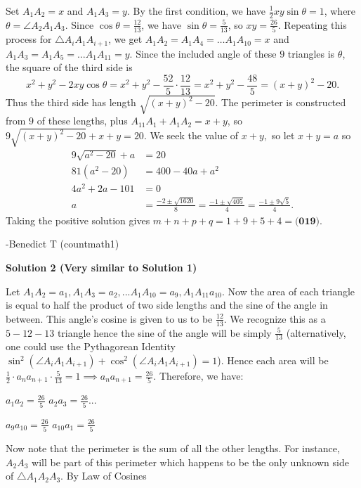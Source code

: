 \begin{enumerate}
Set $A_1A_2 = x$ and $A_1A_3 = y$. By the first condition, we have $\frac{1}{2}xy\sin\theta = 1$, where $\theta = \angle A_2 A_1 A_3$. Since $\cos\theta = \frac{12}{13}$, we have $\sin\theta = \frac{5}{13}$, so $xy = \frac{26}{5}$. Repeating this process for $\triangle A_i A_1 A_{i+1}$, we get $A_1A_2 = A_1A_4 = \ldots A_1A_{10} = x$ and $A_1A_3 = A_1A_5 = \ldots A_1A_{11} = y$. Since the included angle of these $9$ triangles is $\theta$, the square of the third side is 
 \[x^2 + y^2 - 2xy\cos\theta = x^2 + y^2 - \frac{52}{5}\cdot \frac{12}{13} = x^2 + y^2 - \frac{48}{5} = (x+y)^2 - 20.\]Thus the third side has length $\sqrt{(x+y)^2 - 20}.$ The perimeter is constructed from $9$ of these lengths, plus $A_{11}A_1 + A_1A_2 = x + y$, so $9\sqrt{(x+y)^2 - 20} + x + y = 20$. We seek the value of $x + y,$ so let $x + y = a$ so 
 \begin{align*} 9\sqrt{a^2 - 20} + a &= 20\\ 81(a^2 - 20) &= 400 - 40a + a^2\\ 4a^2 + 2a - 101 &= 0 \\ a &= \frac{-2 \pm \sqrt{1620}}{8} = \frac{-1 \pm \sqrt{405}}{4} = \frac{-1 \pm 9\sqrt{5}}{4}. \end{align*}
Taking the positive solution gives $m + n + p + q = 1 + 9 + 5 + 4 = \boxed{\textbf{(019)}}.$

 -Benedict T (countmath1)

 



\textbf{Solution 2 (Very similar to Solution 1)}

Let $A_1 A_2 = a_1, A_1 A_3 = a_2, ... A_1 A_{10} = a_9, A_1 A_11 a_{10}$. Now the area of each triangle is equal to half the product of two side lengths and the sine of the angle in between. This angle's cosine is given to us to be $\frac{12}{13}$. We recognize this as a $5-12-13$ triangle hence the sine of the angle will be simply $\frac{5}{13}$ (alternatively, one could use the Pythagorean Identity $\sin^2(\angle A_iA_1A_{i+1})+\cos^2(\angle A_iA_1A_{i+1})=1$). Hence each area will be $\frac{1}{2} \cdot a_n a_{n + 1} \cdot \frac{5}{13} = 1 \implies a_n a_{n+ 1} = \frac{26}{5}$. Therefore, we have:

 $a_1 a_2 = \frac{26}{5}$
$a_2 a_3 = \frac{26}{5}$...

 $a_9 a_{10} = \frac{26}{5}$
$a_{10} a_1 = \frac{26}{5}$

 Now note that the perimeter is the sum of all the other lengths. For instance, $A_2 A_3$ will be part of this perimeter which happens to be the only unknown side of $\triangle A_1 A_2 A_3$. By Law of Cosines


\end{enumerate}
